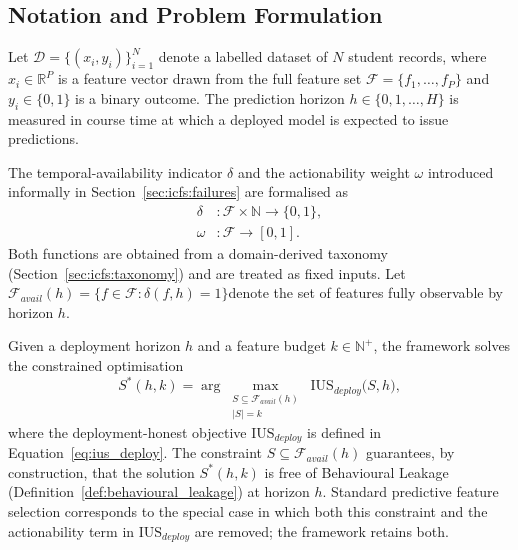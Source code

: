 \documentclass[a4paper,fleqn]{cas-sc}
\begin{document}
\subsection{Notation and Problem Formulation}
\label{sec:icfs:notation}

Let $\mathcal{D} = \{(x_i, y_i)\}_{i=1}^{N}$ denote a labelled dataset of $N$ student records, where $x_i \in \mathbb{R}^P$ is a feature vector drawn from the full feature set $\mathcal{F} = \{f_1, \ldots, f_P\}$ and $y_i \in \{0, 1\}$ is a binary outcome. The prediction horizon $h \in \{0, 1, \ldots, H\}$ is measured in course time at which a deployed model is expected to issue predictions.

The temporal-availability indicator $\delta$ and the actionability weight $\omega$ introduced informally in Section~\ref{sec:icfs:failures} are formalised as
\begin{align*}
    \delta &: \mathcal{F} \times \mathbb{N} \to \{0, 1\}, \\
    \omega &: \mathcal{F} \to [0, 1].
\end{align*}
Both functions are obtained from a domain-derived taxonomy (Section~\ref{sec:icfs:taxonomy}) and are treated as fixed inputs. Let $\mathcal{F}_{avail}(h) = \{f \in \mathcal{F} : \delta(f, h) = 1\}$denote the set of features fully observable by horizon $h$.

Given a deployment horizon $h$ and a feature budget $k \in \mathbb{N}^+$, the framework solves the constrained optimisation
\begin{equation}
    S^*(h, k)
    = \arg\max_{\substack{S \subseteq \mathcal{F}_{avail}(h) \\ |S| = k}}
        \;\mathrm{IUS}_{deploy}\bigl(S, h\bigr),
    \label{eq:problem_formulation}
\end{equation}
where the deployment-honest objective $\mathrm{IUS}_{deploy}$ is defined in Equation~\eqref{eq:ius_deploy}. The constraint $S \subseteq \mathcal{F}_{avail}(h)$ guarantees, by construction, that the solution $S^*(h, k)$ is free of Behavioural Leakage (Definition~\ref{def:behavioural_leakage}) at horizon $h$. Standard predictive feature selection corresponds to the special case in which both this constraint and the actionability term in $\mathrm{IUS}_{deploy}$ are removed; the framework retains both.



\end{document}
